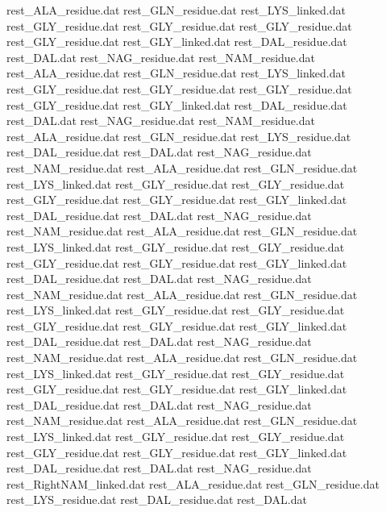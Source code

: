rest_ALA_residue.dat            
rest_GLN_residue.dat            
rest_LYS_linked.dat             
rest_GLY_residue.dat
rest_GLY_residue.dat
rest_GLY_residue.dat
rest_GLY_residue.dat
rest_GLY_linked.dat
rest_DAL_residue.dat            
rest_DAL.dat                    
rest_NAG_residue.dat            
rest_NAM_residue.dat            
rest_ALA_residue.dat            
rest_GLN_residue.dat            
rest_LYS_linked.dat             
rest_GLY_residue.dat
rest_GLY_residue.dat
rest_GLY_residue.dat
rest_GLY_residue.dat
rest_GLY_linked.dat
rest_DAL_residue.dat            
rest_DAL.dat                    
rest_NAG_residue.dat            
rest_NAM_residue.dat            
rest_ALA_residue.dat            
rest_GLN_residue.dat            
rest_LYS_residue.dat            
rest_DAL_residue.dat            
rest_DAL.dat                    
rest_NAG_residue.dat            
rest_NAM_residue.dat            
rest_ALA_residue.dat            
rest_GLN_residue.dat            
rest_LYS_linked.dat             
rest_GLY_residue.dat
rest_GLY_residue.dat
rest_GLY_residue.dat
rest_GLY_residue.dat
rest_GLY_linked.dat
rest_DAL_residue.dat            
rest_DAL.dat                    
rest_NAG_residue.dat            
rest_NAM_residue.dat            
rest_ALA_residue.dat            
rest_GLN_residue.dat            
rest_LYS_linked.dat             
rest_GLY_residue.dat
rest_GLY_residue.dat
rest_GLY_residue.dat
rest_GLY_residue.dat
rest_GLY_linked.dat
rest_DAL_residue.dat            
rest_DAL.dat                    
rest_NAG_residue.dat            
rest_NAM_residue.dat            
rest_ALA_residue.dat            
rest_GLN_residue.dat            
rest_LYS_linked.dat             
rest_GLY_residue.dat
rest_GLY_residue.dat
rest_GLY_residue.dat
rest_GLY_residue.dat
rest_GLY_linked.dat
rest_DAL_residue.dat            
rest_DAL.dat                    
rest_NAG_residue.dat            
rest_NAM_residue.dat            
rest_ALA_residue.dat            
rest_GLN_residue.dat            
rest_LYS_linked.dat             
rest_GLY_residue.dat
rest_GLY_residue.dat
rest_GLY_residue.dat
rest_GLY_residue.dat
rest_GLY_linked.dat
rest_DAL_residue.dat            
rest_DAL.dat                    
rest_NAG_residue.dat            
rest_NAM_residue.dat            
rest_ALA_residue.dat            
rest_GLN_residue.dat            
rest_LYS_linked.dat             
rest_GLY_residue.dat
rest_GLY_residue.dat
rest_GLY_residue.dat
rest_GLY_residue.dat
rest_GLY_linked.dat
rest_DAL_residue.dat            
rest_DAL.dat                    
rest_NAG_residue.dat            
rest_RightNAM_linked.dat        
rest_ALA_residue.dat            
rest_GLN_residue.dat            
rest_LYS_residue.dat            
rest_DAL_residue.dat            
rest_DAL.dat                    
